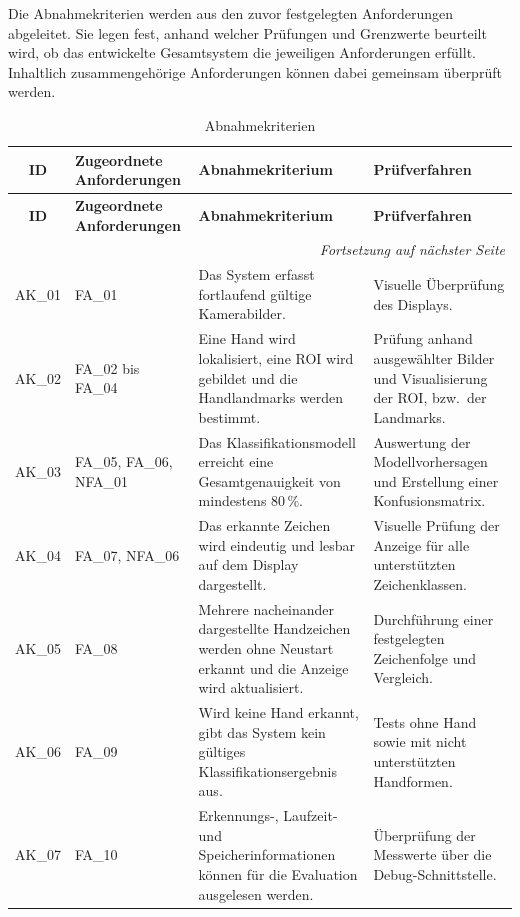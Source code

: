 Die Abnahmekriterien werden aus den zuvor festgelegten Anforderungen abgeleitet. Sie legen fest, anhand welcher Prüfungen und Grenzwerte beurteilt wird, ob das entwickelte Gesamtsystem die jeweiligen Anforderungen erfüllt. Inhaltlich zusammengehörige Anforderungen können dabei gemeinsam überprüft werden.

\begin{longtable}{|c|p{2.75cm}|p{}|p{}|}
    \caption{Abnahmekriterien}
    \label{tab:abnahmekriterien} \\
    \hline
    \textbf{ID} & \textbf{Zugeordnete Anforderungen} & \textbf{Abnahmekriterium} & \textbf{Prüfverfahren} \\
    \hline
    \endfirsthead
    \hline
    \textbf{ID} & \textbf{Zugeordnete Anforderungen} & \textbf{Abnahmekriterium} & \textbf{Prüfverfahren} \\
    \hline
    \endhead
    \hline
    \multicolumn{4}{r}{\textit{Fortsetzung auf nächster Seite}} \\
    \endfoot
    \hline
    \endlastfoot
    AK\_01 & FA\_01 & Das System erfasst fortlaufend gültige Kamerabilder. & Visuelle Überprüfung des Displays. \\
    \hline
    AK\_02 & FA\_02 bis FA\_04 & Eine Hand wird lokalisiert, eine ROI wird gebildet und die Handlandmarks werden bestimmt. & Prüfung anhand ausgewählter Bilder und Visualisierung der ROI, bzw.\ der Landmarks. \\
    \hline
    AK\_03 & FA\_05, FA\_06, NFA\_01 & Das Klassifikationsmodell erreicht eine Gesamtgenauigkeit von mindestens 80\,\%. & Auswertung der Modellvorhersagen und Erstellung einer Konfusionsmatrix. \\
    \hline
    AK\_04 & FA\_07, NFA\_06 & Das erkannte Zeichen wird eindeutig und lesbar auf dem Display dargestellt. & Visuelle Prüfung der Anzeige für alle unterstützten Zeichenklassen. \\
    \hline
    AK\_05 & FA\_08 & Mehrere nacheinander dargestellte Handzeichen werden ohne Neustart erkannt und die Anzeige wird aktualisiert. & Durchführung einer festgelegten Zeichenfolge und Vergleich. \\
    \hline
    AK\_06 & FA\_09 & Wird keine Hand erkannt, gibt das System kein gültiges Klassifikationsergebnis aus. & Tests ohne Hand sowie mit nicht unterstützten Handformen. \\
    \hline
    AK\_07 & FA\_10 & Erkennungs-, Laufzeit- und Speicherinformationen können für die Evaluation ausgelesen werden. & Überprüfung der Messwerte über die Debug-Schnittstelle. \\

\end{longtable}
